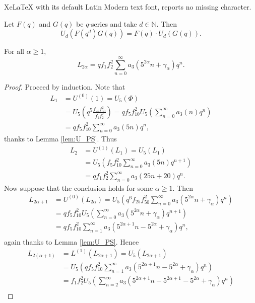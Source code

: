 \documentclass[10pt,a4paper]{amsart}
\newcommand{\NN}{\mathbb{N}}
\begin{document}
XeLaTeX with its default Latin Modern text font, reports no missing character.
\begin{lem}\label{lem:U_PS}
Let $F(q)$ and $G(q)$ be $q$-series and take $d \in \NN.$ Then
\[U_d\left(F(q^d)G(q)\right) = F(q) \cdot U_d\left(G(q)\right).\]
\end{lem}

\begin{lem}\label{lem:L_seq}
For all $\alpha \geq 1$,
\[L_{2\alpha} = qf_1f_2^2 \sum\limits_{n=0}^\infty a_3\left(5^{2\alpha} n + \gamma_{\alpha}\right)q^n.\]
\end{lem}

\begin{proof} 
Proceed by induction. Note that 
\begin{align*}
L_1 &= U^{(0)}(1) = U_5(\Phi) \\
&= U_5\left(q^5 \frac{f_{25}f_{50}^2}{f_1f_2^2}\right) = qf_5f_{10}^2 U_5\left(\sum\limits_{n=0}^\infty a_3(n)q^n\right) \\
&= qf_5f_{10}^2 \sum\limits_{n=0}^\infty a_3(5n)q^n,
\end{align*}
thanks to Lemma \ref{lem:U_PS}. Thus
\begin{align*}
L_2 &= U^{(1)}(L_1) = U_5(L_1) \\
&=U_5\left(f_5 f_{10}^2 \sum\limits_{n=0}^\infty a_3(5n) q^{n+1}\right) \\
&= q f_1 f_2^2 \sum\limits_{n=0}^\infty a_3(25n+20) q^n.
\end{align*}
Now suppose that the conclusion holds for some $\alpha \geq 1.$ Then
\begin{align*}
L_{2\alpha+1} &= U^{(0)}(L_{2\alpha}) = U_5\left(q^6f_{25}f_{50}^2 \sum\limits_{n=0}^\infty a_3\left(5^{2\alpha} n + \gamma_{\alpha}\right)q^n\right) \\
&= qf_5f_{10}^2 U_5\left(\sum\limits_{n=0}^\infty a_3\left(5^{2\alpha}n+\gamma_\alpha\right)q^{n+1}\right) \\
&= qf_5f_{10}^2 \sum\limits_{n=1}^\infty a_3\left(5^{2\alpha+1}n - 5^{2\alpha}+\gamma_\alpha\right) q^n, \\
\end{align*}
again thanks to Lemma \ref{lem:U_PS}. Hence
\begin{align*} 
L_{2(\alpha+1)} &= L^{(1)}(L_{2\alpha+1}) = U_5(L_{2\alpha+1}) \\
&=U_5\left(qf_5f_{10}^2 \sum\limits_{n=1}^\infty a_3\left(5^{2\alpha+1}n - 5^{2\alpha}+\gamma_\alpha\right) q^n\right) \\
&= f_1f_2^2 U_5\left(\sum\limits_{n=2}^\infty a_3\left(5^{2\alpha+1}n - 5^{2\alpha+1} - 5^{2\alpha}+\gamma_\alpha\right) q^n \right) \\

\end{align*}
\end{proof}
\end{document}
